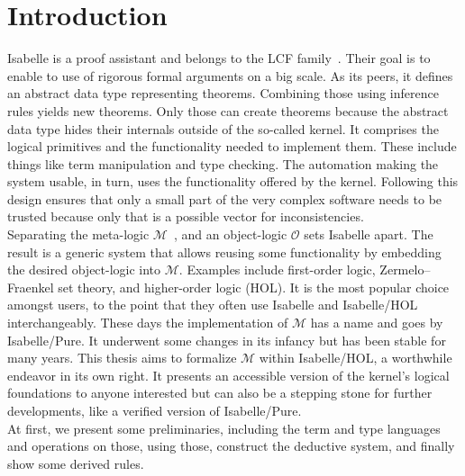 
\chapter{Introduction}\label{chapter:introduction}

Isabelle is a proof assistant and belongs to the LCF family~\parencite{Gordon2000}.
Their goal is to enable to use of rigorous formal arguments on a big scale.
As its peers, it defines an abstract data type representing theorems.
Combining those using inference rules yields new theorems.
Only those can create theorems because the abstract data type hides their internals outside of the so-called kernel.
It comprises the logical primitives and the functionality needed to implement them.
These include things like term manipulation and type checking. The automation making the system usable, in turn, uses the functionality offered by the kernel.
Following this design ensures that only a small part of the very complex software needs to be trusted because only that is a possible vector for inconsistencies.\\

Separating the meta-logic \(\mathcal{M}\)~\parencite{Paulson1988}, and an object-logic \(\mathcal{O}\) sets Isabelle apart.
The result is a generic system that allows reusing some functionality by embedding the desired object-logic into \(\mathcal{M}\).
Examples include first-order logic, Zermelo–Fraenkel set theory, and higher-order logic (HOL).
It is the most popular choice amongst users, to the point that they often use Isabelle and Isabelle/HOL interchangeably.
These days the implementation of \(\mathcal{M}\) has a name and goes by Isabelle/Pure.
It underwent some changes in its infancy but has been stable for many years.
This thesis aims to formalize \(\mathcal{M}\) within Isabelle/HOL, a worthwhile endeavor in its own right.
It presents an accessible version of the kernel's logical foundations to anyone interested but can also be a stepping stone for further developments, like a verified version of Isabelle/Pure.\\

At first, we present some preliminaries, including the term and type languages and operations on those, using those, construct the deductive system, and finally show some derived rules.